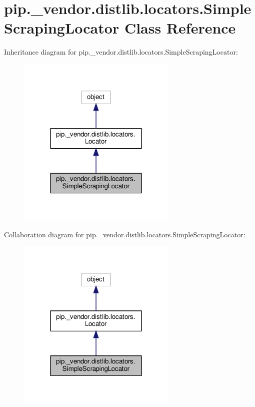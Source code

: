 \hypertarget{classpip_1_1__vendor_1_1distlib_1_1locators_1_1SimpleScrapingLocator}{}\section{pip.\+\_\+vendor.\+distlib.\+locators.\+Simple\+Scraping\+Locator Class Reference}
\label{classpip_1_1__vendor_1_1distlib_1_1locators_1_1SimpleScrapingLocator}


Inheritance diagram for pip.\+\_\+vendor.\+distlib.\+locators.\+Simple\+Scraping\+Locator\+:
\nopagebreak
\begin{figure}[H]
\begin{center}
\leavevmode
\includegraphics[width=216pt]{classpip_1_1__vendor_1_1distlib_1_1locators_1_1SimpleScrapingLocator__inherit__graph}
\end{center}
\end{figure}


Collaboration diagram for pip.\+\_\+vendor.\+distlib.\+locators.\+Simple\+Scraping\+Locator\+:
\nopagebreak
\begin{figure}[H]
\begin{center}
\leavevmode
\includegraphics[width=216pt]{classpip_1_1__vendor_1_1distlib_1_1locators_1_1SimpleScrapingLocator__coll__graph}
\end{center}
\end{figure}
